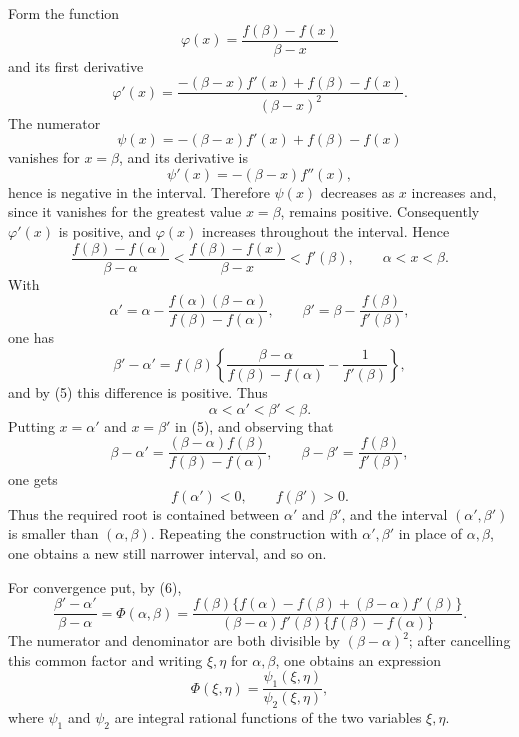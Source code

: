 \documentclass[11pt]{article}
\begin{document}
Form the function
\[
        \varphi(x)=\frac{f(\beta)-f(x)}{\beta-x}
\]
and its first derivative
\[
        \varphi'(x)=
        \frac{-(\beta-x)f'(x)+f(\beta)-f(x)}{(\beta-x)^2}.
\]
The numerator
\[
        \psi(x)=-(\beta-x)f'(x)+f(\beta)-f(x)
\]
vanishes for $x=\beta$, and its derivative is
\[
        \psi'(x)=-(\beta-x)f''(x),
\]
hence is negative in the interval. Therefore $\psi(x)$ decreases as $x$ increases and, since it vanishes for the greatest value $x=\beta$, remains positive. Consequently $\varphi'(x)$ is positive, and $\varphi(x)$ increases throughout the interval. Hence
\begin{equation}
        \frac{f(\beta)-f(\alpha)}{\beta-\alpha}
        <\frac{f(\beta)-f(x)}{\beta-x}
        <f'(\beta),\qquad \alpha<x<\beta.
\tag{5}
\end{equation}
With
\[
        \alpha'=\alpha-\frac{f(\alpha)(\beta-\alpha)}{f(\beta)-f(\alpha)},
        \qquad
        \beta'=\beta-\frac{f(\beta)}{f'(\beta)},
\]
one has
\begin{equation}
        \beta'-\alpha'=f(\beta)\left\{
        \frac{\beta-\alpha}{f(\beta)-f(\alpha)}-\frac1{f'(\beta)}
        \right\},
\tag{6}
\end{equation}
and by (5) this difference is positive. Thus
\[
        \alpha<\alpha'<\beta'<\beta.
\]
Putting $x=\alpha'$ and $x=\beta'$ in (5), and observing that
\[
        \beta-\alpha'=\frac{(\beta-\alpha)f(\beta)}{f(\beta)-f(\alpha)},
        \qquad
        \beta-\beta'=\frac{f(\beta)}{f'(\beta)},
\]
one gets
\[
        f(\alpha')<0,\qquad f(\beta')>0.
\]
Thus the required root is contained between $\alpha'$ and $\beta'$, and the interval $(\alpha',\beta')$ is smaller than $(\alpha,\beta)$. Repeating the construction with $\alpha',\beta'$ in place of $\alpha,\beta$, one obtains a new still narrower interval, and so on.

For convergence put, by (6),
\begin{equation}
        \frac{\beta'-\alpha'}{\beta-\alpha}
        =\Phi(\alpha,\beta)
        =\frac{f(\beta)\{f(\alpha)-f(\beta)+(\beta-\alpha)f'(\beta)\}}
        {(\beta-\alpha)f'(\beta)\{f(\beta)-f(\alpha)\}}.
\tag{7}
\end{equation}
The numerator and denominator are both divisible by $(\beta-\alpha)^2$; after cancelling this common factor and writing $\xi,\eta$ for $\alpha,\beta$, one obtains an expression
\[
        \Phi(\xi,\eta)=\frac{\psi_1(\xi,\eta)}{\psi_2(\xi,\eta)},
\]
where $\psi_1$ and $\psi_2$ are integral rational functions of the two variables $\xi,\eta$.
\end{document}
